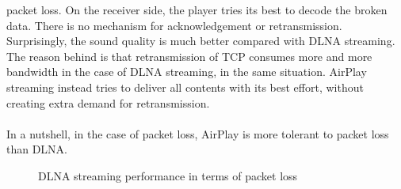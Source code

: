 packet loss. On the receiver side, the player tries its best to decode the
broken data. There is no mechanism for acknowledgement or retransmission.
Surprisingly, the sound quality is much better compared with DLNA streaming.
The reason behind is that retransmission of TCP consumes more and more
bandwidth in the case of DLNA streaming, in the same situation.
AirPlay streaming instead tries to deliver all contents with its best effort,
without creating extra demand for retransmission.\\
\\
In a nutshell, in the case of packet loss, AirPlay is more tolerant to packet loss than DLNA.
\begin{figure}[hb]
\caption{DLNA streaming performance in terms of packet loss \label{dlna_pl}}
\end{figure}

